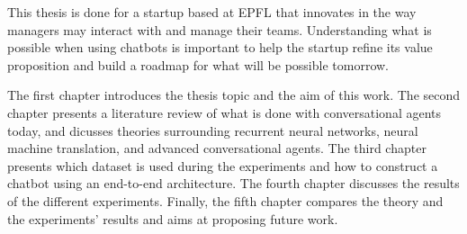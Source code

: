 This thesis is done for a startup based at EPFL that innovates in the way managers may interact with and manage their teams.
Understanding what is possible when using chatbots is important to help the startup refine its value proposition and build a roadmap for what will be possible tomorrow.

The first chapter introduces the thesis topic and the aim of this work. The second chapter presents a literature review of what is done with conversational agents today, and dicusses theories surrounding recurrent neural networks, neural machine translation, and advanced conversational agents.
The third chapter presents which dataset is used during the experiments and how to construct a chatbot using an end-to-end architecture. The fourth chapter discusses the results of the different experiments.
Finally, the fifth chapter compares the theory and the experiments' results and aims at proposing future work.
